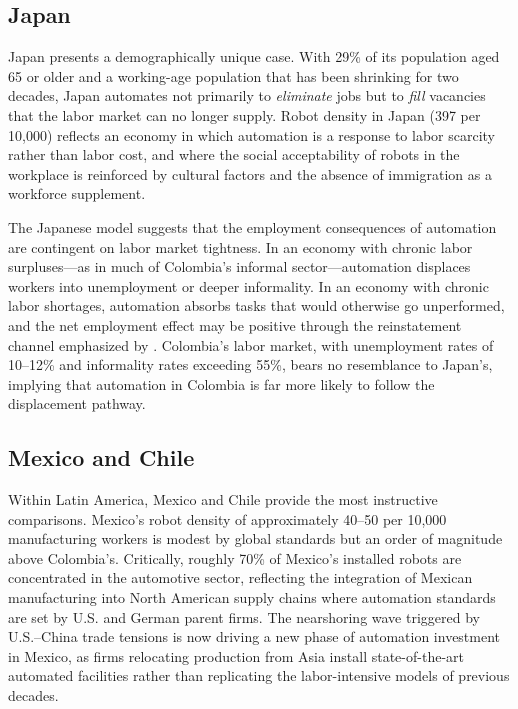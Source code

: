 \documentclass{article}
\begin{document}
\subsection{Japan}
\label{subsec:japan}

Japan presents a demographically unique case. With 29\% of its population aged 65 or older and a working-age population that has been shrinking for two decades, Japan automates not primarily to \textit{eliminate} jobs but to \textit{fill} vacancies that the labor market can no longer supply. Robot density in Japan (397 per 10,000) reflects an economy in which automation is a response to labor scarcity rather than labor cost, and where the social acceptability of robots in the workplace is reinforced by cultural factors and the absence of immigration as a workforce supplement.

The Japanese model suggests that the employment consequences of automation are contingent on labor market tightness. In an economy with chronic labor surpluses---as in much of Colombia's informal sector---automation displaces workers into unemployment or deeper informality. In an economy with chronic labor shortages, automation absorbs tasks that would otherwise go unperformed, and the net employment effect may be positive through the reinstatement channel emphasized by \cite{acemoglu2019automation}. Colombia's labor market, with unemployment rates of 10--12\% and informality rates exceeding 55\%, bears no resemblance to Japan's, implying that automation in Colombia is far more likely to follow the displacement pathway.

\subsection{Mexico and Chile}
\label{subsec:mexico_chile}

Within Latin America, Mexico and Chile provide the most instructive comparisons. Mexico's robot density of approximately 40--50 per 10,000 manufacturing workers is modest by global standards but an order of magnitude above Colombia's. Critically, roughly 70\% of Mexico's installed robots are concentrated in the automotive sector, reflecting the integration of Mexican manufacturing into North American supply chains where automation standards are set by U.S. and German parent firms. The nearshoring wave triggered by U.S.--China trade tensions is now driving a new phase of automation investment in Mexico, as firms relocating production from Asia install state-of-the-art automated facilities rather than replicating the labor-intensive models of previous decades.
\end{document}
